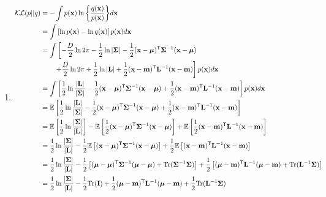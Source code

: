 \documentclass{amsmlaj}
\begin{document}
\begin{sol}
	\begin{enumerate}
		\item \begin{align}
			\mathcal{KL}(p||q)
			&= - \int {p(\vt{x})\ln \left\{{\frac{{q(\vt{x})}}{{p(\vt{x})}}}\right\}} d\vt{x} \nonumber \\
			&= \int \left[ \ln p(\vt{x})-\ln q(\vt{x}) \right] p(\vt{x})d\vt{x} \\
			&= \int \left[ -\frac{D}{2}\ln 2\pi
			-\frac{1}{2}\ln|\vt{\Sigma}|-\frac{1}{2}(\vt{x}-\vt{\mu})^\trans\vt{\Sigma}^{-1}(\vt{x}-\vt{\mu})
				\right. \nonumber \\
				&\qquad \left.+\frac{D}{2}\ln2\pi+\frac{1}{2}\ln|\vt{L}|
				+\frac{1}{2}(\vt{x}-\vt{m})^\trans\vt{L}^{-1}(\vt{x}-\vt{m})
			\right]p(\vt{x})d\vt{x} \\
			&=\int \left[
				\frac{1}{2}\ln\frac{|\vt{L}|}{|\vt{\Sigma}|}
				-\frac{1}{2}(\vt{x}-\vt{\mu})^\trans\vt{\Sigma}^{-1}(\vt{x}-\vt{\mu})
				+\frac{1}{2}(\vt{x}-\vt{m})^\trans\vt{L}^{-1}(\vt{x}-\vt{m})
			\right]p(\vt{x})d\vt{x} \\
			&=\mathbb{E}\left[
				\frac{1}{2}\ln\frac{|\vt{L}|}{|\vt{\Sigma}|}
				-\frac{1}{2}(\vt{x}-\vt{\mu})^\trans\vt{\Sigma}^{-1}(\vt{x}-\vt{\mu})
				+\frac{1}{2}(\vt{x}-\vt{m})^\trans\vt{L}^{-1}(\vt{x}-\vt{m})
			\right] \\
			&=\mathbb{E}\left[ \frac{1}{2}\ln\frac{|\vt{\Sigma}|}{|\vt{L}|} \right]
			-\mathbb{E}\left[\frac{1}{2}(\vt{x}-\vt{\mu})^\trans\vt{\Sigma}^{-1}(\vt{x}-\vt{\mu})\right]
			+\mathbb{E}\left[\frac{1}{2}(\vt{x}-\vt{m})^\trans\vt{L}^{-1}(\vt{x}-\vt{m})\right] \\
			&=\frac{1}{2}\ln\frac{|\vt{\Sigma}|}{|\vt{L}|}
			-\frac{1}{2}\mathbb{E}\left[
				(\vt{x}-\vt{\mu})^\trans\vt{\Sigma}^{-1}(\vt{x}-\vt{\mu})
			\right]+\frac{1}{2}\mathbb{E}\left[
				(\vt{x}-\vt{m})^\trans\vt{L}^{-1}(\vt{x}-\vt{m})
			\right] \\
			&=\frac{1}{2}\ln\frac{|\vt{\Sigma}|}{|\vt{L}|}
			-\frac{1}{2}\left[
				(\vt{\mu}-\vt{\mu})^\trans\vt{\Sigma}^{-1}(\vt{\mu}-\vt{\mu})
				+\text{Tr}(\vt{\Sigma}^{-1}\vt{\Sigma})
			\right]+\frac{1}{2}\left[
				(\vt{\mu}-\vt{m})^\trans\vt{L}^{-1}(\vt{\mu}-\vt{m})
				+\text{Tr}(\vt{L}^{-1}\vt{\Sigma})
			\right] \\
			&=\frac{1}{2}\ln\frac{|\vt{\Sigma}|}{|\vt{L}|}
			-\frac{1}{2}\text{Tr}(\vt{I})+\frac{1}{2}
			(\vt{\mu}-\vt{m})^\trans\vt{L}^{-1}(\vt{\mu}-\vt{m})
			+\frac{1}{2}\text{Tr}(\vt{L}^{-1}\vt{\Sigma}) \\

\end{align}
\end{enumerate}
\end{sol}
\end{document}
